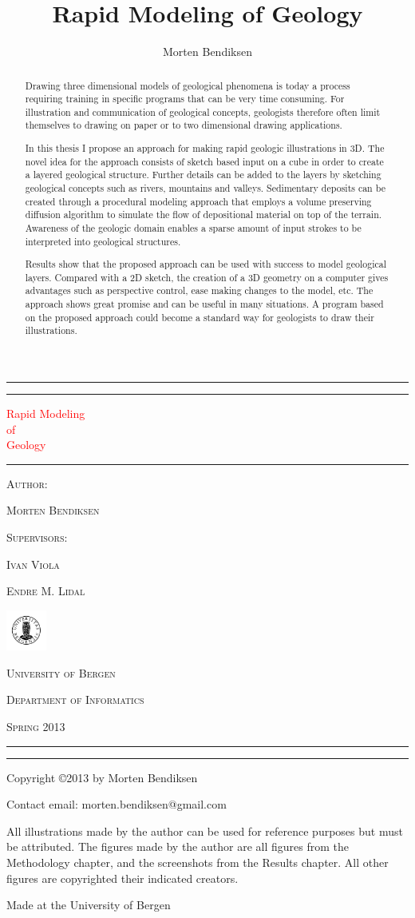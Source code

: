 \documentclass[a4paper,12pt]{report}
\title{Rapid Modeling of Geology}
\author{Morten Bendiksen}
\newcommand*{\plogo}{\includegraphics[width=0.1\textwidth]{uiblogo.pdf}} %
\newcommand*{\titleAT}{\begingroup %
\newlength{\drop} %
\drop=0.06\textheight %

\rule{\textwidth}{1pt}\par %
\vspace{2pt}\vspace{-\baselineskip} %
\rule{\textwidth}{0.4pt}\par %

\vspace{\drop} %
\centering %
\textcolor{Red}{ %
{\Huge Rapid Modeling}\\[0.5\baselineskip] %
{\Large of}\\[0.75\baselineskip] %
{\Huge Geology}} %

\vspace{0.25\drop} %
\rule{0.3\textwidth}{0.4pt}\par %
\vspace{\drop} %


{ \textsc{Author:}}\par %
{\Large \textsc{Morten Bendiksen}}\par %
\vspace{\drop}
\vspace{\drop}
{ \textsc{Supervisors:}}\par %
{\Large \textsc{Ivan Viola}}\par %
{\Large \textsc{Endre M. Lidal}}\par %

\vfill %


{\large \textcolor{Red}{\plogo}}\par %
{\large \textsc{University of Bergen}}\par %
{\large \textsc{Department of Informatics}}\par %
{\large \textsc{Spring 2013}}\par %

\vspace*{\drop} %

\rule{\textwidth}{0.4pt}\par %
\vspace{2pt}\vspace{-\baselineskip} %
\rule{\textwidth}{1pt}\par %

\endgroup}
\begin{document}
\pagestyle{empty} 
\titleAT


\clearpage
\begin{abstract}
Drawing three dimensional models of geological phenomena is today a process requiring training in specific programs that can be very time consuming. For illustration and communication of geological concepts, geologists therefore often limit themselves to drawing on paper or to two dimensional drawing applications.

In this thesis I propose an approach for making rapid geologic illustrations in 3D. The novel idea for the approach consists of sketch based input on a cube in order to create a layered geological structure. Further details can be added to the layers by sketching geological concepts such as rivers, mountains and valleys. Sedimentary deposits can be created through a procedural modeling approach that employs a volume preserving diffusion algorithm to simulate the flow of depositional material on top of the terrain. Awareness of the geologic domain enables a sparse amount of input strokes to be interpreted into geological structures.

Results show that the proposed approach can be used with success to model geological layers. Compared with a 2D sketch, the creation of a 3D geometry on a computer gives advantages such as perspective control, ease making changes to the model, etc. The approach shows great promise and can be useful in many situations. A program based on the proposed approach could become a standard way for geologists to draw their illustrations.
\end{abstract}

\clearpage
\null\vfill 
\pagestyle{empty}
\begin{minipage}[b]{0.9\textwidth}
\footnotesize\raggedright
\setlength{\parskip}{0.5\baselineskip}
Copyright \copyright 2013 by Morten Bendiksen\par
Contact email: morten.bendiksen@gmail.com

All illustrations made by the author can be used for reference purposes but must be attributed. The figures made by the author are all figures from the Methodology chapter, and the screenshots from the Results chapter. All other figures are copyrighted their indicated creators.

Made at the University of Bergen

\end{minipage}

\clearpage
\end{document}
